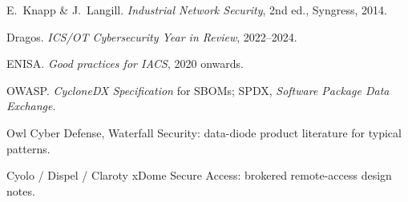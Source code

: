 \documentclass[aspectratio=169,11pt]{beamer}
\begin{document}
{  \item E.\ Knapp \& J.\ Langill. \emph{Industrial Network Security}, 2nd ed., Syngress, 2014.
  \item Dragos. \emph{ICS/OT Cybersecurity Year in Review}, 2022--2024.
  \item ENISA. \emph{Good practices for IACS}, 2020 onwards.
  \item OWASP. \emph{CycloneDX Specification} for SBOMs; SPDX, \emph{Software Package Data Exchange}.
  \item Owl Cyber Defense, Waterfall Security: data-diode product literature for typical patterns.
  \item Cyolo / Dispel / Claroty xDome Secure Access: brokered remote-access design notes.
}

\closingframe
\end{document}
